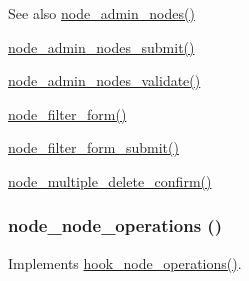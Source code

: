 \begin{DoxySeeAlso}{See also}
\hyperlink{group__forms_ga3fb56c702a3c16eddd2fcd8ccd3e4adb}{node\_\-admin\_\-nodes()} 

\hyperlink{node_8admin_8inc_a5f159cfed0d6cce65d5d70747efec391}{node\_\-admin\_\-nodes\_\-submit()} 

\hyperlink{node_8admin_8inc_a32a9ea91250aaf84de44f784a3569944}{node\_\-admin\_\-nodes\_\-validate()} 

\hyperlink{group__forms_ga2b7edb82b488db11ffde4fa60958004d}{node\_\-filter\_\-form()} 

\hyperlink{node_8admin_8inc_a346f00ebb9b4aae36025623d893c5061}{node\_\-filter\_\-form\_\-submit()} 

\hyperlink{group__forms_ga25cc06a5aa3aa17eadc5a8a97e7c5e9e}{node\_\-multiple\_\-delete\_\-confirm()} 
\end{DoxySeeAlso}
\hypertarget{node_8admin_8inc_a6e9cc98ef5c62744d557bf52b8531553}{
\subsubsection[{node\_\-node\_\-operations}]{\setlength{\rightskip}{0pt plus 5cm}node\_\-node\_\-operations ()}}
\label{node_8admin_8inc_a6e9cc98ef5c62744d557bf52b8531553}
Implements \hyperlink{group__hooks_gadedee7943c08aeed54ea520c34471a28}{hook\_\-node\_\-operations()}. 
